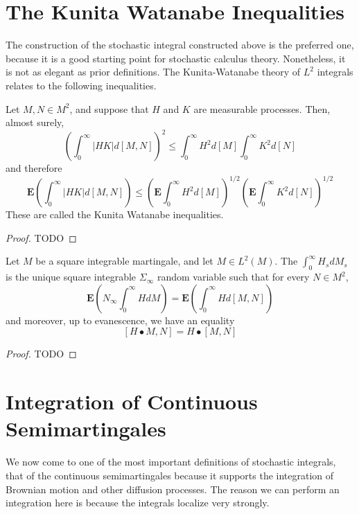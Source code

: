 \section{The Kunita Watanabe Inequalities}

The construction of the stochastic integral constructed above is the preferred one, because it is a good starting point for stochastic calculus theory. Nonetheless, it is not as elegant as prior definitions. The Kunita-Watanabe theory of $L^2$ integrals relates to the following inequalities.

\begin{theorem}
    Let $M,N \in M^2$, and suppose that $H$ and $K$ are measurable processes. Then, almost surely,
    \[ \left( \int_0^\infty |HK| d[M,N] \right)^2 \leq \int_0^\infty H^2 d[M] \int_0^\infty K^2 d[N] \]
    and therefore
    \[ \mathbf{E} \left( \int_0^\infty |HK| d[M,N] \right) \leq \left( \mathbf{E} \int_0^\infty H^2 d[M] \right)^{1/2} \left( \mathbf{E} \int_0^\infty K^2 d[N] \right)^{1/2} \]
    These are called the Kunita Watanabe inequalities.
\end{theorem}
\begin{proof}
    TODO
\end{proof}

\begin{theorem}
    Let $M$ be a square integrable martingale, and let $M \in L^2(M)$. The $\int_0^\infty H_s dM_s$ is the unique square integrable $\Sigma_\infty$ random variable such that for every $N \in M^2$,
    \[ \mathbf{E} \left( N_\infty \int_0^\infty H dM \right) = \mathbf{E} \left( \int_0^\infty H d[M,N] \right) \]
    and moreover, up to evanescence, we have an equality
    \[ [H \bullet M, N] = H \bullet [M,N] \]
\end{theorem}
\begin{proof}
    TODO
\end{proof}

\section{Integration of Continuous Semimartingales}

We now come to one of the most important definitions of stochastic integrals, that of the continuous semimartingales because it supports the integration of Brownian motion and other diffusion processes. The reason we can perform an integration here is because the integrals localize very strongly.

